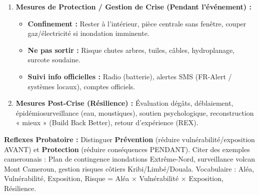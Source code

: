 \documentclass[11pt]{article}
\newcommand{\cle}[1]{{\popxbold\color{popdark}#1}}
\begin{document}
\begin{methode}
\begin{enumerate}
\begin{itemize}
        \item \textbf{Plans d'urgence :} \cle{PCS} (Plan Communal de Sauvegarde) obligatoire communes à risque. \cle{PIMS} (Plan d'Intervention de Mise en Sûreté) pour établissements recevant du public (écoles, hôpitaux).
        \item \textbf{Information population :} Consignes (kit survie 72h, mise en sécurité objets, évacuation bétail, bouchage ouvertures).
        \item \textbf{Évacuation préventive :} Zones basses, mobile-homes, habitats précaires, avant H-0 (vents $>$ 80 km/h rendent évacuation impossible).
    \end{itemize}
    \item \textbf{Mesures de Protection / Gestion de Crise (Pendant l'événement) :}
    \begin{itemize}
        \item \textbf{Confinement :} Rester à l'intérieur, pièce centrale sans fenêtre, couper gaz/électricité si inondation imminente.
        \item \textbf{Ne pas sortir :} Risque chutes arbres, tuiles, câbles, hydroplanage, surcote soudaine.
        \item \textbf{Suivi info officielles :} Radio (batterie), alertes SMS (FR-Alert / systèmes locaux), comptes officiels.
    \end{itemize}
    \item \textbf{Mesures Post-Crise (Résilience) :} Évaluation dégâts, déblaiement, épidémiosurveillance (eau, moustiques), soutien psychologique, reconstruction « mieux » (Build Back Better), retour d'expérience (REX).
\end{enumerate}
\textbf{Reflexes Probatoire :} Distinguer \textbf{Prévention} (réduire vulnérabilité/exposition AVANT) et \textbf{Protection} (réduire conséquences PENDANT). Citer des exemples camerounais : Plan de contingence inondations Extrême-Nord, surveillance volcan Mont Cameroun, gestion risques côtiers Kribi/Limbé/Douala. Vocabulaire : \cle{Aléa}, \cle{Vulnérabilité}, \cle{Exposition}, \cle{Risque = Aléa $\times$ Vulnérabilité $\times$ Exposition}, \cle{Résilience}.
\end{methode}
\end{document}
